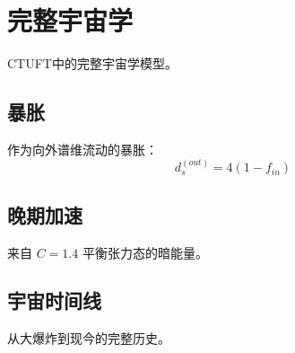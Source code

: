 \section{完整宇宙学}
\label{sec:cosmology_complete}

CTUFT中的完整宇宙学模型。

\subsection{暴胀}

作为向外谱维流动的暴胀：
\begin{equation}
d_s^{(out)} = 4(1 - f_{in})
\end{equation}

\subsection{晚期加速}

来自 $C = 1.4$ 平衡张力态的暗能量。

\subsection{宇宙时间线}

从大爆炸到现今的完整历史。
